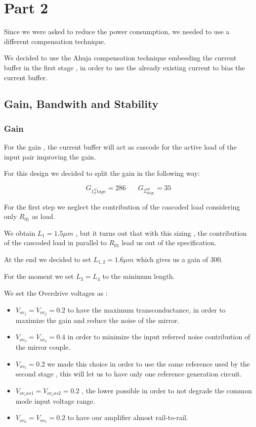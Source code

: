 \chapter{Part 2} %
\label{cha:part_2}

Since we were asked to reduce the power consumption, we needed to use a different compensation technique.

We decided to use the Ahuja compensation technique embeeding the current buffer in the first stage , in order to use the already existing current to bias the current buffer.

\section{Gain, Bandwith and Stability}

\subsection{Gain} %
\label{sec:gain}

For the gain , the current buffer will act as cascode for the active load of the input pair improving the gain.

For this design we decided to split the gain in the following way:

\begin{equation}
	G_{1^{st}_Stage}=286 \ \ \ \ \ \ \ \ 
	G_{2^{nd}_{Stage}}=35
\end{equation}


For the first step we neglect the contribution of the cascoded load considering only $R_{01}$ as load.

We obtain $L_1=1.5 \mu m$ , but it turns out that with this sizing , the contribution of the cascoded load in parallel to $R_{01}$ lead us out of the specification.

At the end we decided to set $L_{1,2} = 1.6 \mu m$ which gives us a gain of 300.

For the moment we set $L_3=L_4$ to the minimum length.

We set the Overdrive voltages as :

\begin{itemize}
	\item $V_{ov_1}=V_{ov_2}=0.2$ to have the maximum transconductance, in order to maximize the gain and reduce the noise of the mirror.

	\item $V_{ov_3}=V_{ov_4}=0.4$ in order to minimize the input referred noise contribution of the mirror couple.

	\item $V_{ov_5}=0.2$ we made this choice in order to use the same reference used by the second stage , this will let us to have only one reference generation circuit.

	\item $V_{ov_cas1}=V_{ov_cas2}=0.2$ , the lower possible in order to not degrade the common mode input voltage range.

	\item $V_{ov_6}=V_{ov_7}=0.2$ to have our amplifier almost rail-to-rail.

\end{itemize}


